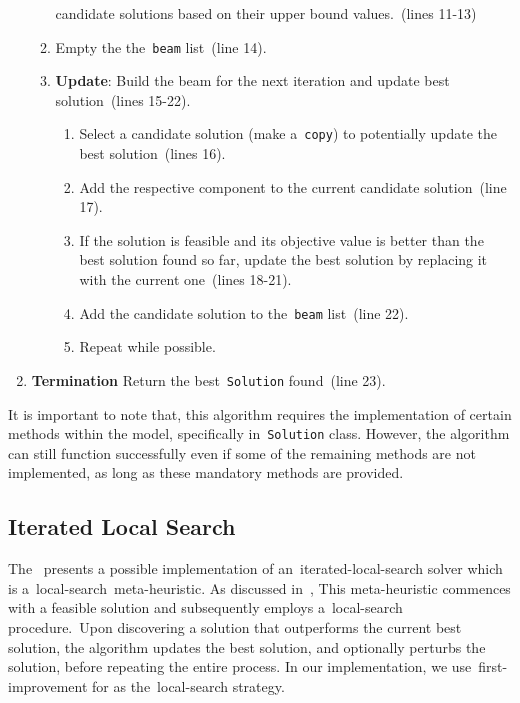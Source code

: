 \begin{enumerate}
\begin{enumerate}
                        candidate solutions based on their upper bound values.~(lines 11-13)
                  \item Empty the the~\texttt{beam} list~(line 14).
                  \item \textbf{Update}: Build the beam for the next iteration and update best solution~(lines 15-22).
                        \begin{enumerate}
                              \item Select a candidate solution (make a~\texttt{copy}) to
                                    potentially update the best solution~(lines 16).
                              \item Add the respective component to the current candidate solution~(line 17).
                              \item If the solution is feasible and its objective value is better than
                                    the best solution found so far, update the best solution by replacing
                                    it with the current one~(lines 18-21).
                              \item Add the candidate solution to the~\texttt{beam} list~(line 22).
                              \item Repeat while possible.
                        \end{enumerate}
            \end{enumerate}
      \item \textbf{Termination} Return the best~\texttt{Solution} found~(line 23).
\end{enumerate}

It is important to note that, this algorithm requires the implementation of
certain methods within the model, specifically in~\texttt{Solution} class.
However, the algorithm can still function successfully even if some of the
remaining methods are not implemented, as long as these mandatory methods are
provided.

\subsection{Iterated Local Search}
\label{subsec:ils}

The~ presents a possible implementation of
an~\acrshort{iterated-local-search} solver which is
a~\acrshort{local-search}~\acrshort{meta-heuristic}. As discussed
in~, This meta-heuristic commences with a feasible solution
and subsequently employs a~\acrshort{local-search} procedure.~Upon discovering a
solution that outperforms the current best solution, the algorithm updates the
best solution, and optionally perturbs the solution, before repeating the entire
process. In our implementation, we use~\acrshort{first-improvement} for
as the~\acrshort{local-search} strategy.

